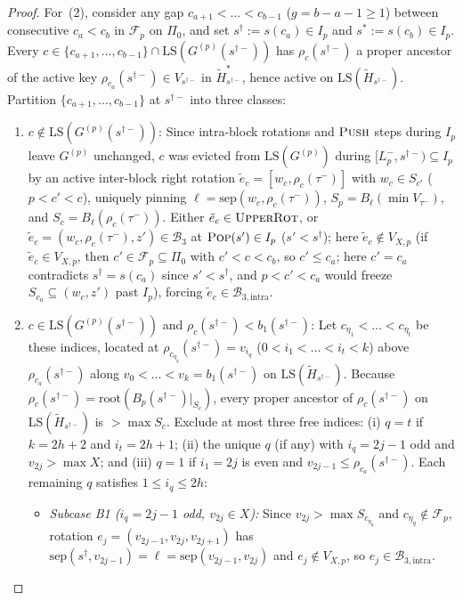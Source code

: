 \documentclass[11pt]{article}
\theoremstyle{definition}
\theoremstyle{remark}
\newcommand{\LS}{\mathrm{LS}}
\newcommand{\sep}{\mathrm{sep}}
\newcommand{\PUSH}{\textnormal{\scshape Push}}
\newcommand{\POP}{\textnormal{\scshape Pop}}
\newcommand{\UPROT}{\textnormal{\scshape UpperRot}}
\begin{document}
\begin{proof}
For~(2), consider any gap $c_{a+1} < \dots < c_{b-1}$ ($g = b - a - 1 \ge 1$) between consecutive $c_a < c_b$ in $\mathcal{F}_p$ on $\Pi_0$, and set $s^\dagger := s(c_a) \in I_p$ and $s^* := s(c_b) \in I_p$. Every $c \in \{c_{a+1}, \dots, c_{b-1}\} \cap \LS(G^{(p)}(s^{\dagger -}))$ has $\rho_c(s^{\dagger -})$ a proper ancestor of the active key $\rho_{c_a}(s^{\dagger -}) \in V_{s^{\dagger -}}$ in $\widetilde{H}^*_{s^{\dagger -}}$, hence active on $\LS(\widetilde{H}_{s^{\dagger -}})$. Partition $\{c_{a+1}, \dots, c_{b-1}\}$ at $s^{\dagger -}$ into three classes:
\begin{enumerate}[label=(\Alph*)]
  \item $c \notin \LS(G^{(p)}(s^{\dagger -}))$: Since intra-block rotations and $\PUSH$ steps during $I_p$ leave $G^{(p)}$ unchanged, $c$ was evicted from $\LS(G^{(p)})$ during $[L_p^-, s^{\dagger -}) \subseteq I_p$ by an active inter-block right rotation $\tilde{e}_c = [w_c, \rho_c(\tau^-)]$ with $w_c \in S_{c'}$ ($p < c' < c$), uniquely pinning $\ell = \sep(w_c, \rho_c(\tau^-))$, $S_p = B_\ell(\min V_{\tau^-})$, and $S_c = B_\ell(\rho_c(\tau^-))$. Either $\tilde{e}_c \in \UPROT$, or $\tilde{e}_c = (w_c, \rho_c(\tau^-), z') \in \mathcal{B}_3$ at $\POP(s') \in I_p$ ($s' < s^\dagger$); here $\tilde{e}_c \notin V_{X, p}$ (if $\tilde{e}_c \in V_{X, p}$, then $c' \in \mathcal{F}_p \subseteq \Pi_0$ with $c' < c < c_b$, so $c' \le c_a$; here $c' = c_a$ contradicts $s^\dagger = s(c_a)$ since $s' < s^\dagger$, and $p < c' < c_a$ would freeze $S_{c_a} \subseteq (w_c, z')$ past $I_p$), forcing $\tilde{e}_c \in \mathcal{B}_{3,\mathrm{intra}}$.
  \item $c \in \LS(G^{(p)}(s^{\dagger -}))$ and $\rho_c(s^{\dagger -}) < b_1(s^{\dagger -})$: Let $c_{\eta_1} < \dots < c_{\eta_t}$ be these indices, located at $\rho_{c_{\eta_q}}(s^{\dagger -}) = v_{i_q}$ ($0 < i_1 < \dots < i_t < k$) above $\rho_{c_a}(s^{\dagger -})$ along $v_0 < \dots < v_k = b_1(s^{\dagger -})$ on $\LS(\widetilde{H}_{s^{\dagger -}})$. Because $\rho_c(s^{\dagger -}) = \mathrm{root}(B_p(s^{\dagger -})|_{S_c})$, every proper ancestor of $\rho_c(s^{\dagger -})$ on $\LS(\widetilde{H}_{s^{\dagger -}})$ is $> \max S_c$. Exclude at most three free indices: (i) $q = t$ if $k = 2h + 2$ and $i_t = 2h + 1$; (ii) the unique $q$ (if any) with $i_q = 2j - 1$ odd and $v_{2j} > \max X$; and (iii) $q = 1$ if $i_1 = 2j$ is even and $v_{2j-1} \le \rho_{c_a}(s^{\dagger -})$. Each remaining $q$ satisfies $1 \le i_q \le 2h$:
  \begin{itemize}[leftmargin=1.5em]
    \item \emph{Subcase B1 ($i_q = 2j - 1$ odd, $v_{2j} \in X$):} Since $v_{2j} > \max S_{c_{\eta_q}}$ and $c_{\eta_q} \notin \mathcal{F}_p$, rotation $e_j = (v_{2j-1}, v_{2j}, v_{2j+1})$ has $\sep(s^\dagger, v_{2j-1}) = \ell = \sep(v_{2j-1}, v_{2j})$ and $e_j \notin V_{X, p}$, so $e_j \in \mathcal{B}_{3,\mathrm{intra}}$.

\end{itemize}
\end{enumerate}
\end{proof}
\end{document}
